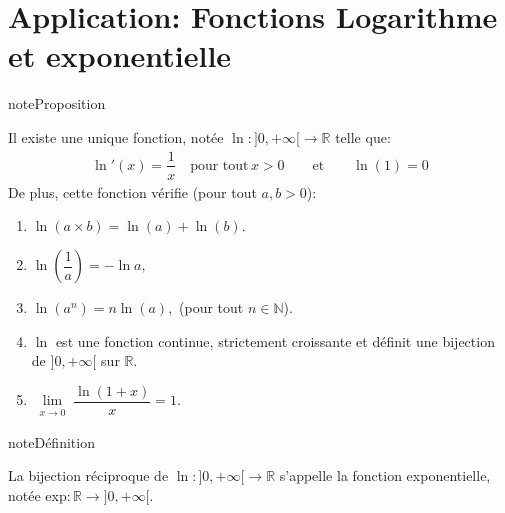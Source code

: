 \documentclass[letterpaper,10pt,french]{jupyterBook}
\begin{document}
\section{Application: Fonctions Logarithme et exponentielle}
\label{\detokenize{limitefcts:application-fonctions-logarithme-et-exponentielle}}
\begin{sphinxadmonition}{note}{Proposition}

\sphinxAtStartPar
Il existe une unique fonction, notée \(\ln:]0,+\infty[\rightarrow\mathbb{R}\) telle que:
\begin{equation*}
\begin{split}
\ln'(x)=\dfrac{1}{x}\quad\mbox{pour tout}\,x>0\qquad\mbox{et}\qquad \ln(1)=0
\end{split}
\end{equation*}
\sphinxAtStartPar
De plus, cette fonction vérifie (pour tout \(a,b>0\)):
\begin{enumerate}
%
\item {} 
\sphinxAtStartPar
\(\ln(a\times b)=\ln(a)+\ln(b).\)

\item {} 
\sphinxAtStartPar
\(\ln(\dfrac{1}{a})=-\ln a,\)

\item {} 
\sphinxAtStartPar
\(\ln (a^n)=n\ln(a),\) (pour tout \(n\in \mathbb{N}\)).

\item {} 
\sphinxAtStartPar
\(\ln\) est une fonction continue, strictement croissante et définit une bijection de \(]0,+\infty[\) sur \(\mathbb{R}.\)

\item {} 
\sphinxAtStartPar
\(\lim\limits_{\substack{x\rightarrow0}}\dfrac{\ln(1+x)}{x}=1.\)

\end{enumerate}
\end{sphinxadmonition}

\begin{sphinxadmonition}{note}{Définition}

\sphinxAtStartPar
La bijection réciproque de \(\ln:]0,+\infty[\rightarrow\mathbb{R}\) s’appelle la fonction exponentielle, notée exp\(:\mathbb{R}\rightarrow]0,+\infty[.\)
\end{sphinxadmonition}
\end{document}
